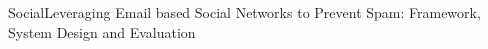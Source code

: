 \begin{frame}{Social}{Leveraging Email based Social Networks to Prevent Spam: Framework, System Design and Evaluation \cite{hameed_leveraging_2012}}

\end{frame}

